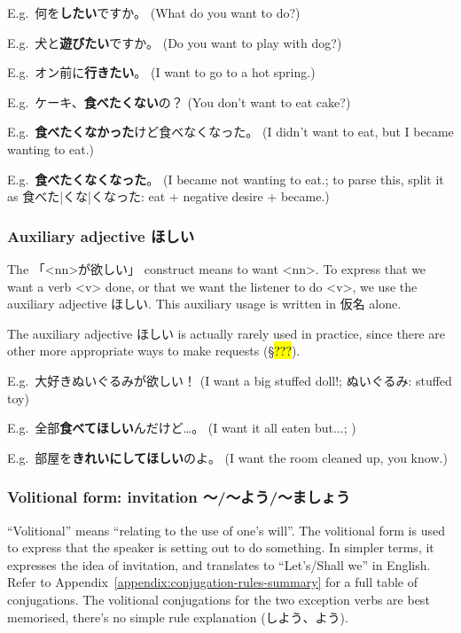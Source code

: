 \documentclass[../nihongo-gakushuu-kyouzai.tex]{subfiles}
\begin{document}
E.g.\ 何を\textbf{したい}ですか。 (What do you want to do?)

E.g.\ 犬と\textbf{遊びたい}ですか。 (Do you want to play with dog?)

E.g.\ オン前に\textbf{行きたい}。 (I want to go to a hot spring.)

E.g.\ ケーキ、\textbf{食べたくない}の？ (You don't want to eat cake?)

E.g.\ \textbf{食べたくなかった}けど食べなくなった。 (I didn't want to eat, but I became wanting to eat.)

E.g.\ \textbf{食べたくなくなった}。 (I became not wanting to eat.; to parse this, split it as 食べた|くな|くなった: eat + negative desire + became.)


\subsubsection{Auxiliary adjective ほしい} \label{sec:auxiliary-adjective-hoshii}
The 「<nn>が欲しい」 construct means to want <nn>. To express that we want a verb <v> done, or that we want the listener to do <v>, we use the auxiliary adjective ほしい. This auxiliary usage is written in 仮名 alone.

The auxiliary adjective ほしい is actually rarely used in practice, since there are other more appropriate ways to make requests (\S\hl{???}).

E.g.\ 大好きぬいぐるみが欲しい！ (I want a big stuffed doll!; ぬいぐるみ: stuffed toy)

E.g.\ 全部\textbf{食べてほしい}んだけど\dots。 (I want it all eaten but...; )

E.g.\ 部屋を\textbf{きれいにしてほしい}のよ。 (I want the room cleaned up, you know.)


\subsubsection{Volitional form: invitation 〜/〜よう/〜ましょう} \label{sec:volitional-form}
``Volitional'' means ``relating to the use of one's will''. The volitional form is used to express that the speaker is setting out to do something. In simpler terms, it expresses the idea of invitation, and translates to ``Let's/Shall we'' in English. Refer to Appendix~\ref{appendix:conjugation-rules-summary} for a full table of conjugations. The volitional conjugations for the two exception verbs are best memorised, there's no simple rule explanation (しよう、よう).
\end{document}
